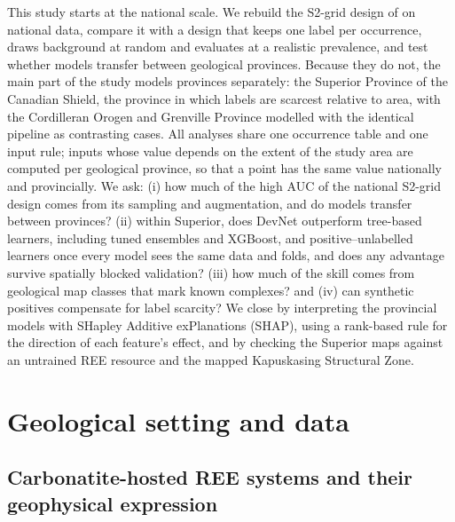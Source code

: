 \documentclass[pdflatex,sn-apa]{sn-jnl}
\begin{document}
This study starts at the national scale. We rebuild the S2-grid design of \citet{Parsa2024} on national data, compare it with a design that keeps one label per occurrence, draws background at random and evaluates at a realistic prevalence, and test whether models transfer between geological provinces. Because they do not, the main part of the study models provinces separately: the Superior Province of the Canadian Shield, the province in which labels are scarcest relative to area, with the Cordilleran Orogen and Grenville Province modelled with the identical pipeline as contrasting cases. All analyses share one occurrence table and one input rule; inputs whose value depends on the extent of the study area are computed per geological province, so that a point has the same value nationally and provincially. We ask: (i) how much of the high AUC of the national S2-grid design comes from its sampling and augmentation, and do models transfer between provinces? (ii) within Superior, does DevNet outperform tree-based learners, including tuned ensembles and XGBoost, and positive--unlabelled learners once every model sees the same data and folds, and does any advantage survive spatially blocked validation? (iii) how much of the skill comes from geological map classes that mark known complexes? and (iv) can synthetic positives compensate for label scarcity? We close by interpreting the provincial models with SHapley Additive exPlanations (SHAP), using a rank-based rule for the direction of each feature's effect, and by checking the Superior maps against an untrained REE resource and the mapped Kapuskasing Structural Zone.

\section{Geological setting and data}\label{sec:data}

\subsection{Carbonatite-hosted REE systems and their geophysical expression}\label{sec:mineral-system}
\end{document}
